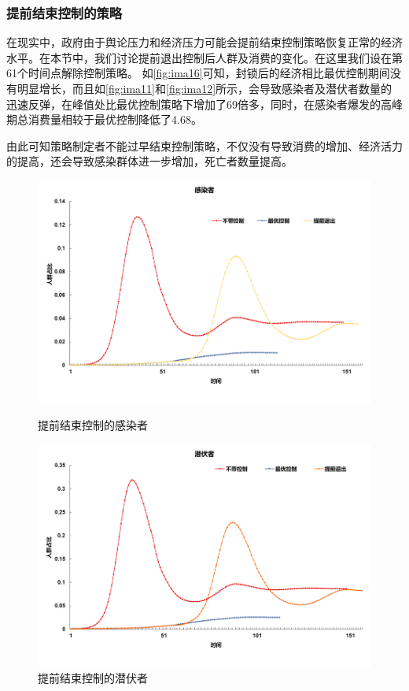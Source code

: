 \subsubsection{提前结束控制的策略}
在现实中，政府由于舆论压力和经济压力可能会提前结束控制策略恢复正常的经济水平。在本节中，我们讨论提前退出控制后人群及消费的变化。在这里我们设在第61个时间点解除控制策略。
如\autoref{fig:ima16}可知，封锁后的经济相比最优控制期间没有明显增长，而且如\autoref{fig:ima11}和\autoref{fig:ima12}所示，会导致感染者及潜伏者数量的迅速反弹，在峰值处比最优控制策略下增加了69倍多，同时，在感染者爆发的高峰期总消费量相较于最优控制降低了4.68。

由此可知策略制定者不能过早结束控制策略，不仅没有导致消费的增加、经济活力的提高，还会导致感染群体进一步增加，死亡者数量提高。
\begin{figure}[htbp]
	\centering
	\begin{minipage}{0.49\linewidth}
		\centering
		\includegraphics[width=0.9\linewidth]{fig/image024.png}
		\caption{提前结束控制的感染者}
		\label{fig:ima11}%
	\end{minipage}
	\begin{minipage}{0.49\linewidth}
		\centering
		\includegraphics[width=0.9\linewidth]{fig/image032.png}
		\caption{提前结束控制的潜伏者}
		\label{fig:ima12}%
	\end{minipage}
	

\end{figure}
